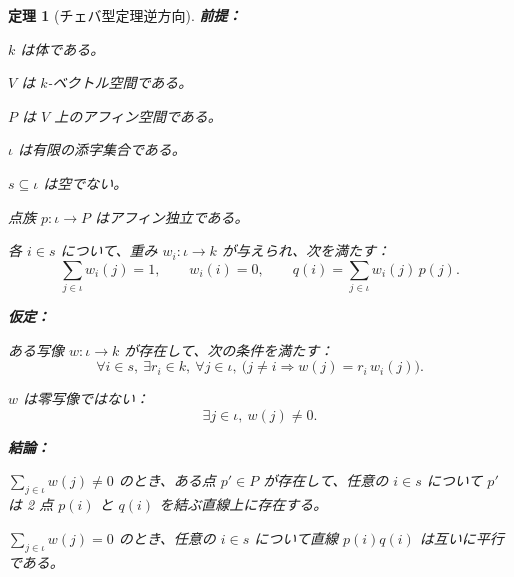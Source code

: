 \documentclass[a4paper,12pt]{bxjsbook}
\theoremstyle{theorem}
\newtheorem{theorem}{定理}[chapter]
\begin{document}
    \begin{theorem}[チェバ型定理逆方向]
        \noindent\textbf{前提：}\par
        \begin{theoremenumerate}[label=(P\arabic*), leftmargin=4em, topsep=2pt, partopsep=0pt, itemsep=0pt, parsep=0pt]
            \item $k$ は体である。
            \item $V$ は $k$-ベクトル空間である。
            \item $P$ は $V$ 上のアフィン空間である。
            \item $\iota$ は有限の添字集合である。
            \item $s \subseteq \iota$ は空でない。
            \item 点族 $p:\iota\to P$ はアフィン独立である。
            \item 各 $i\in s$ について、重み $w_i:\iota\to k$ が与えられ、次を満たす：
            \[
            \sum_{j\in\iota} w_i(j)=1,
            \qquad
            w_i(i)=0,
            \qquad
            q(i)=\sum_{j\in\iota} w_i(j)\,p(j).
            \]
        \end{theoremenumerate}

        \noindent\textbf{仮定：}\par
        \begin{theoremenumerate}[label=(A\arabic*), leftmargin=4em, topsep=2pt, partopsep=0pt, itemsep=0pt, parsep=0pt]
            \item ある写像 $w:\iota\to k$ が存在して、次の条件を満たす：
            \[
            \forall i\in s,\ \exists r_i\in k,\ \forall j\in\iota,\ \bigl(j\neq i \Rightarrow w(j)=r_i\,w_i(j)\bigr).
            \]
            \item $w$ は零写像ではない：
            \[
            \exists j\in\iota,\ w(j)\neq 0.
            \]
        \end{theoremenumerate}

        \noindent\textbf{結論：}\par
        \begin{theoremenumerate}[label=(C\arabic*), leftmargin=4em, topsep=2pt, partopsep=0pt, itemsep=0pt, parsep=0pt]
            \item $\sum_{j\in\iota} w(j)\neq 0$ のとき、ある点 $p'\in P$ が存在して、任意の $i\in s$ について $p'$ は 2 点 $p(i)$ と $q(i)$ を結ぶ直線上に存在する。
            \item $\sum_{j\in\iota} w(j)=0$ のとき、任意の $i\in s$ について直線 $p(i)q(i)$ は互いに平行である。
        \end{theoremenumerate}
    \end{theorem}
\end{document}
